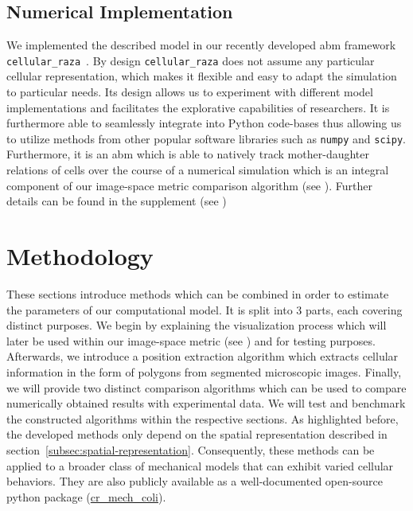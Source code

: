\subsection{Numerical Implementation}
We implemented the described model in our recently developed \ac{abm} framework
\texttt{cellular\_raza}~\cite{Pleyer2025}.
By design \texttt{cellular\_raza} does not assume any particular cellular representation, which
makes it flexible and easy to adapt the simulation to particular needs.
Its design allows us to experiment with different model implementations and facilitates the
explorative capabilities of researchers.
It is furthermore able to seamlessly integrate into Python code-bases thus allowing
us to utilize
methods from other popular software libraries such as \texttt{numpy} and \texttt{scipy}.
Furthermore, it is an \ac{abm} which is able to natively track mother-daughter
relations of cells
over the course of a numerical simulation which is an integral component of our
image-space metric
comparison algorithm (see ).
Further details can be found in the supplement (see )

\section{Methodology}
\label{sec:methodology}
These sections introduce methods which can be combined in order to estimate the
parameters of our
computational model.
It is split into 3 parts, each covering distinct purposes.
We begin by explaining the visualization process which will later be used within our image-space
metric (see ) and for testing purposes.
Afterwards, we introduce a position extraction algorithm which extracts cellular
information in the
form of polygons from segmented microscopic images.
Finally, we will provide two distinct comparison algorithms which can be used to
compare numerically
obtained results with experimental data.
We will test and benchmark the constructed algorithms within the respective sections.
As highlighted before, the developed methods only depend on the spatial
representation described in
section~\ref{subsec:spatial-representation}.
Consequently, these methods can be applied to a broader class of mechanical models
that can exhibit
varied cellular behaviors.
They are also publicly available as a well-documented open-source python package
(\href{https://github.com/jonaspleyer/cr_mech_coli}{cr\_mech\_coli}).

